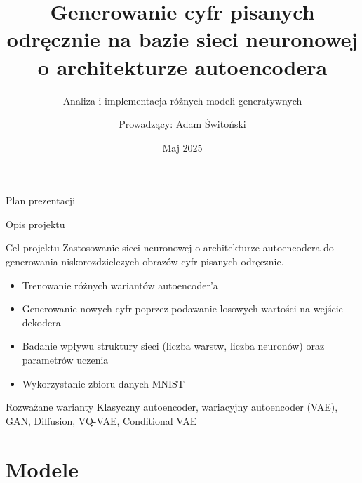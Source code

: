 \documentclass{beamer}
\title{Generowanie cyfr pisanych odręcznie na bazie sieci neuronowej o architekturze autoencodera}
\subtitle{Analiza i implementacja różnych modeli generatywnych}
\author{Prowadzący: Adam Świtoński}
\institute{Politechnika Śląska}
\date{Maj 2025}
\begin{document}
\begin{frame}
  \titlepage
\end{frame}

\begin{frame}{Plan prezentacji}
  \tableofcontents
\end{frame}

\begin{frame}{Opis projektu}
  \begin{block}{Cel projektu}
    Zastosowanie sieci neuronowej o architekturze autoencodera do generowania niskorozdzielczych obrazów cyfr pisanych odręcznie.
  \end{block}
  
  \begin{itemize}
    \item Trenowanie różnych wariantów autoencoder'a
    \item Generowanie nowych cyfr poprzez podawanie losowych wartości na wejście dekodera
    \item Badanie wpływu struktury sieci (liczba warstw, liczba neuronów) oraz parametrów uczenia
    \item Wykorzystanie zbioru danych MNIST
  \end{itemize}
  
  \begin{block}{Rozważane warianty}
    Klasyczny autoencoder, wariacyjny autoencoder (VAE), GAN, Diffusion, VQ-VAE, Conditional VAE
  \end{block}
\end{frame}


\section{Modele}
\end{document}
